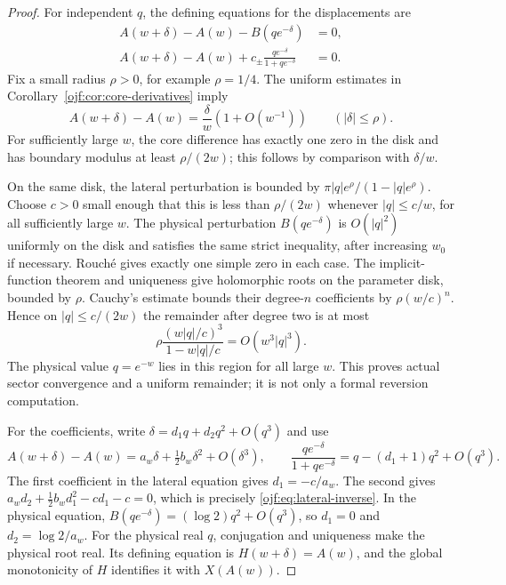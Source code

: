 \begin{proof}
For independent $q$, the defining equations for the displacements are
\begin{align}
 A(w+\delta)-A(w)-B(qe^{-\delta})&=0,
                                             \label{ojf:eq:inv-physical-eq}\\
 A(w+\delta)-A(w)+c_\pm
       \frac{qe^{-\delta}}{1+qe^{-\delta}}&=0.
                                             \label{ojf:eq:inv-lateral-eq}
\end{align}
Fix a small radius $\rho>0$, for example $\rho=1/4$. The uniform
estimates in Corollary~\ref{ojf:cor:core-derivatives} imply
\[
 A(w+\delta)-A(w)=\frac\delta w(1+O(w^{-1}))
                    \qquad (|\delta|\le\rho).
\]
For sufficiently large $w$, the core difference has exactly one zero
in the disk and has boundary modulus at least $\rho/(2w)$; this follows
by comparison with $\delta/w$.

On the same disk, the lateral perturbation is bounded by
$\pi |q|e^\rho/(1-|q|e^\rho)$.
Choose $c>0$ small enough that this is less than $\rho/(2w)$ whenever
$|q|\le c/w$, for all sufficiently large $w$.
The physical perturbation $B(qe^{-\delta})$ is $O(|q|^2)$ uniformly
on the disk and satisfies the same strict inequality, after increasing
$w_0$ if necessary. Rouch\'e gives exactly one simple zero in each case.
The implicit-function theorem and uniqueness give holomorphic roots on
the parameter disk, bounded by $\rho$.
Cauchy's estimate bounds their degree-$n$ coefficients by
$\rho(w/c)^n$. Hence on $|q|\le c/(2w)$ the remainder after degree two
is at most
\[
 \rho\frac{(w|q|/c)^3}{1-w|q|/c}=O(w^3|q|^3).
\]
The physical value $q=e^{-w}$ lies in this region for all large $w$.
This proves actual sector convergence and a uniform remainder; it is
not only a formal reversion computation.

For the coefficients, write $\delta=d_1q+d_2q^2+O(q^3)$ and use
\[
 A(w+\delta)-A(w)=a_w\delta+\tfrac12b_w\delta^2+O(\delta^3),
 \qquad
 \frac{qe^{-\delta}}{1+qe^{-\delta}}
       =q-(d_1+1)q^2+O(q^3).
\]
The first coefficient in the lateral equation gives $d_1=-c/a_w$.
The second gives
$a_wd_2+\tfrac12b_wd_1^2-cd_1-c=0$, which is precisely
\eqref{ojf:eq:lateral-inverse}. In the physical equation,
$B(qe^{-\delta})=(\log2)q^2+O(q^3)$, so $d_1=0$ and
$d_2=\log2/a_w$.
For the physical real $q$, conjugation and uniqueness make the physical
root real. Its defining equation is $H(w+\delta)=A(w)$, and the global
monotonicity of $H$ identifies it with $X(A(w))$.
\end{proof}

